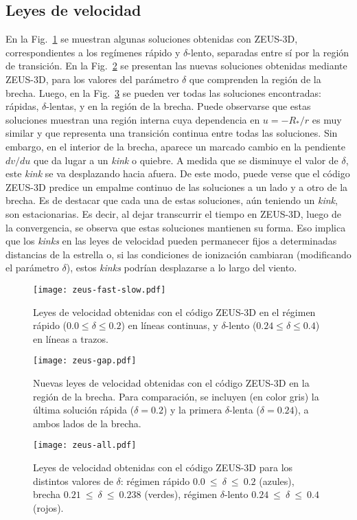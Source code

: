 \documentclass[baaa]{baaa}
\begin{document}
\subsection{Leyes de velocidad}
En la Fig.~\ref{vel-fast-slow} se muestran algunas soluciones obtenidas con ZEUS-3D, correspondientes a los reg\'imenes r\'apido y $\delta$-lento, separadas entre s\'i por la regi\'on de transici\'on. En la Fig.~\ref{vel-gap} se presentan las nuevas soluciones obtenidas mediante ZEUS-3D, para los valores del par\'ametro $\delta$ que comprenden la regi\'on de la brecha. Luego, en la Fig.~\ref{vel-todas} se pueden ver todas las soluciones encontradas: r\'apidas, $\delta$-lentas, y en la regi\'on de la brecha. Puede observarse que estas soluciones muestran una regi\'on interna cuya dependencia en $u = -R_*/r$ es muy similar y que representa una transici\'on continua entre todas las soluciones. Sin embargo, en el interior de la brecha, aparece un marcado cambio en la pendiente $dv/du$ que da lugar a un \textit{kink} o quiebre. A medida que se disminuye el valor de $\delta$, este \textit{kink} se va desplazando hacia afuera. De este modo, puede verse que el c\'odigo ZEUS-3D predice un empalme continuo de las soluciones a un lado y a otro de la brecha. Es de destacar que cada una de estas soluciones, a\'un teniendo un \textit{kink}, son estacionarias. Es decir, al dejar transcurrir el tiempo en ZEUS-3D, luego de la convergencia, se observa que estas soluciones mantienen su forma. Eso implica que los \textit{kinks} en las leyes de velocidad pueden permanecer fijos a determinadas distancias de la estrella o, si las condiciones de ionizaci\'on cambiaran (modificando el par\'ametro $\delta$), estos \textit{kinks} podr\'ian desplazarse a lo largo del viento.
\begin{figure}[!t]
\centering
\texttt{[image: zeus-fast-slow.pdf]}
\caption{Leyes de velocidad obtenidas con el c\'odigo ZEUS-3D en el r\'egimen r\'apido ($0.0 \leq \delta \leq 0.2$) en l\'ineas continuas, y $\delta$-lento ($0.24 \leq \delta \leq 0.4$) en l\'ineas a trazos.}
\label{vel-fast-slow}
\end{figure}
\begin{figure}[!t]
\centering
\texttt{[image: zeus-gap.pdf]}
\caption{Nuevas leyes de velocidad obtenidas con el c\'odigo ZEUS-3D en la regi\'on de la brecha. Para comparaci\'on, se incluyen (en color gris) la última solución rápida ($\delta = 0.2$) y la primera $\delta$-lenta ($\delta = 0.24$), a ambos lados de la brecha.}
\label{vel-gap}
\end{figure}
\begin{figure}[!t]
\centering
\texttt{[image: zeus-all.pdf]}
\caption{Leyes de velocidad obtenidas con el c\'odigo ZEUS-3D para los distintos valores de $\delta$: r\'egimen r\'apido $0.0~\leq~\delta~\leq~0.2$ (azules), brecha $0.21~\leq~\delta~\leq~0.238$ (verdes), r\'egimen $\delta$-lento $0.24~\leq~\delta~\leq~0.4$ (rojos).}
\label{vel-todas}
\end{figure}
\end{document}
